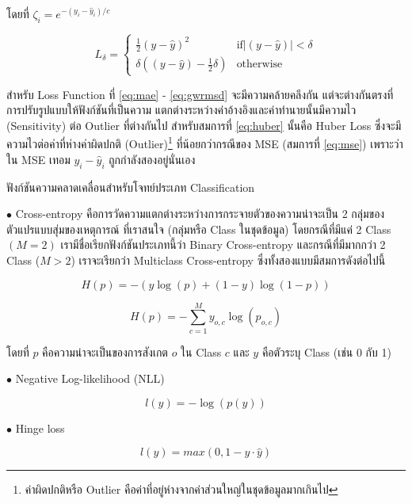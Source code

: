 \noindent โดยที่ $\zeta_{i} = e^{-(y_{i} - \hat{y}_{i}) / c}$

\begin{equation}\label{eq:huber}
    L_{\delta}=
    \left\{\begin{matrix}
        \frac{1}{2}(y - \hat{y})^{2} & \text{if} \left | (y - \hat{y})  \right | < \delta\\
        \delta ((y - \hat{y}) - \frac1 2 \delta) & \text{otherwise}
    \end{matrix}\right.
\end{equation}

สำหรับ Loss Function ที่ \ref{eq:mae} - \ref{eq:gwrmsd} จะมีความคล้ายคลึงกัน แต่จะต่างกันตรงที่การปรับรูปแบบให้ฟังก์ชันที่เป็นความ%
แตกต่างระหว่างค่าอ้างอิงและค่าทำนายนั้นมีความไว (Sensitivity) ต่อ Outlier ที่ต่างกันไป สำหรับสมการที่ \ref{eq:huber} นั้นคือ Huber
Loss ซึ่งจะมีความไวต่อค่าที่ห่างค่าผิดปกติ (Outlier)\footnote{ค่าผิดปกติหรือ Outlier คือค่าที่อยู่ห่างจากค่าส่วนใหญ่ในชุดข้อมูลมากเกินไป} 
ที่น้อยกว่ากรณีของ MSE (สมการที่ \ref{eq:mse}) เพราะว่าใน MSE เทอม $y_{i} - \hat{y}_{i}$ ถูกกำลังสองอยู่นั่นเอง

ฟังก์ชันความคลาดเคลื่อนสำหรับโจทย์ประเภท Classification

\noindent $\bullet$ Cross-entropy คือการวัดความแตกต่างระหว่างการกระจายตัวของความน่าจะเป็น 2 กลุ่มของตัวแปรแบบสุ่มของเหตุการณ์%
ที่เราสนใจ (กลุ่มหรือ Class ในชุดข้อมูล) โดยกรณีที่มีแค่ 2 Class $(M = 2)$ เรามีชื่อเรียกฟังก์ชันประเภทนี้ว่า Binary Cross-entropy 
และกรณีที่มีมากกว่า 2 Class ($M > 2$) เราจะเรียกว่า Multiclass Cross-entropy ซึ่งทั้งสองแบบมีสมการดังต่อไปนี้

\begin{equation}
    H(p) = -{(y\log(p) + (1 - y)\log(1 - p))}
\end{equation}

\begin{equation}
    H(p) = -\sum_{c=1}^My_{o,c}\log(p_{o,c})
\end{equation}


\noindent โดยที่ $p$ คือความน่าจะเป็นของการสังเกต $o$ ใน Class $c$ และ $y$ คือตัวระบุ Class (เช่น 0 กับ 1)

\noindent $\bullet$ Negative Log-likelihood (NLL)

\begin{equation}
    l(y) = -{\log(p(y))}
\end{equation}

\noindent $\bullet$ Hinge loss

\begin{equation}
    l(y) = max(0, 1 - y \cdot \hat{y})
\end{equation}

